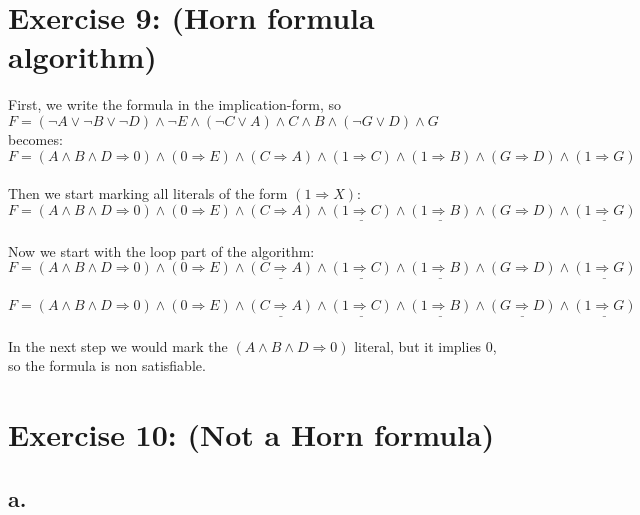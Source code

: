 \documentclass[12pt]{article}
\begin{document}
 

\rhead{\today}


\section*{Exercise 9:  (Horn formula algorithm)}

First, we write the formula in the implication-form, so \\
$F = (\neg A \lor \neg B \lor \neg D) \land \neg E \land (\neg C \lor A) \land C \land B \land (\neg G \lor D) \land G$\\
becomes:\\
$F = (A \land B \land D \Rightarrow 0) \land (0 \Rightarrow E) \land (C \Rightarrow A) \land (1 \Rightarrow C) \land (1 \Rightarrow B) \land (G \Rightarrow D) \land (1 \Rightarrow G)$\\\\
Then we start marking all literals of the form $(1 \Rightarrow X)$:\\
$F = (A \land B \land D \Rightarrow 0) \land (0 \Rightarrow E) \land (C \Rightarrow A) \land \underline{(1 \Rightarrow C)} \land \underline{(1 \Rightarrow B)} \land (G \Rightarrow D) \land \underline{(1 \Rightarrow G)}$\\\\
Now we start with the loop part of the algorithm: \\
$F = (A \land B \land D \Rightarrow 0) \land (0 \Rightarrow E) \land \underline{(C \Rightarrow A)} \land \underline{(1 \Rightarrow C)} \land \underline{(1 \Rightarrow B)} \land (G \Rightarrow D) \land \underline{(1 \Rightarrow G)}$\\\\
$F = (A \land B \land D \Rightarrow 0) \land (0 \Rightarrow E) \land \underline{(C \Rightarrow A)} \land \underline{(1 \Rightarrow C)} \land \underline{(1 \Rightarrow B)} \land \underline{(G \Rightarrow D)} \land \underline{(1 \Rightarrow G)}$\\\\
In the next step we would mark the $(A \land B \land D \Rightarrow 0)$ literal, but it implies 0, so the formula is non satisfiable.


\section*{Exercise 10: (Not a Horn formula)}

\subsection*{a.}
\end{document}
